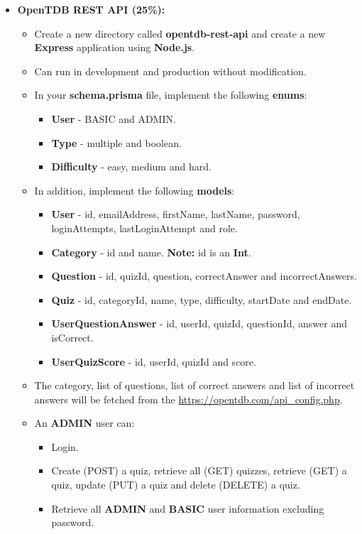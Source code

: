 \documentclass{article}
\begin{document}
\begin{itemize}
	\item \textbf{OpenTDB REST API (25\%):}
	\begin{itemize}
		\item Create a new directory called \textbf{opentdb-rest-api} and create a new \textbf{Express} application using \textbf{Node.js}.
		\item Can run in development and production without modification.
		\item In your \textbf{schema.prisma} file, implement the following \textbf{enums}:
		\begin{itemize}
			\item \textbf{User} - BASIC and ADMIN.
			\item \textbf{Type} - multiple and boolean.
			\item \textbf{Difficulty} - easy, medium and hard.
		\end{itemize}
		\item In addition, implement the following \textbf{models}:
		\begin{itemize}
			\item \textbf{User} - id, emailAddress, firstName, lastName, password, loginAttempts, lastLoginAttempt and role.
			\item \textbf{Category} - id and name. \textbf{Note:} id is an \textbf{Int}.
			\item \textbf{Question} - id, quizId, question, correctAnswer and incorrectAnswers.
			\item \textbf{Quiz} - id, categoryId, name, type, difficulty, startDate and endDate.
			\item \textbf{UserQuestionAnswer} - id, userId, quizId, questionId, answer and isCorrect.
			\item \textbf{UserQuizScore} - id, userId, quizId and score.
		\end{itemize}
		\item The category, list of questions, list of correct answers and list of incorrect answers will be fetched from the \href{OpenTDB API}{https://opentdb.com/api\_config.php}.
		\item An \textbf{ADMIN} user can:
		\begin{itemize}
			\item Login.
			\item Create (POST) a quiz, retrieve all (GET) quizzes, retrieve (GET) a quiz, update (PUT) a quiz and delete (DELETE) a quiz.  	
			\item Retrieve all \textbf{ADMIN} and \textbf{BASIC} user information excluding password.

\end{itemize}
\end{itemize}
\end{itemize}
\end{document}
